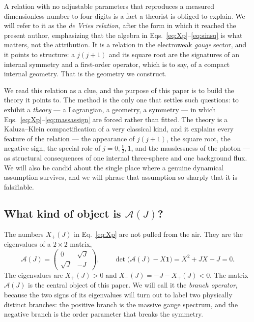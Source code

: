 \documentclass[11pt]{article}
\theoremstyle{plain}
\theoremstyle{definition}
\newcommand{\cA}{\mathcal{A}}
\newcommand{\Xp}{X_{+}}
\newcommand{\Xm}{X_{-}}
\newcommand{\half}{\tfrac12}
\begin{document}
A relation with no adjustable parameters that reproduces a measured
dimensionless number to four digits is a fact a theorist is obliged to
explain. We will refer to it as the \emph{de Vries relation}, after the form
in which it reached the present author, emphasizing that the algebra in
Eqs.~\eqref{eq:Xp}--\eqref{eq:sinsq} is what matters, not the attribution.
It is a relation in the electroweak \emph{gauge} sector, and it points to
structure: a $j(j+1)$ and its square root are the signatures of an internal
symmetry and a first-order operator, which is to say, of a compact internal
geometry. That is the geometry we construct.

We read this relation as a clue, and the purpose of this paper is to build
the theory it points to. The method is the only one that settles such
questions: to exhibit a \emph{theory} --- a Lagrangian, a geometry, a
symmetry --- in which Eqs.~\eqref{eq:Xp}--\eqref{eq:massassign} are forced
rather than fitted. The theory is a Kaluza--Klein compactification of a very
classical kind, and it explains every feature of the relation --- the
appearance of $j(j+1)$, the square root, the negative sign, the special role
of $j=0,\half,1$, and the masslessness of the photon --- as structural
consequences of one internal three-sphere
and one background flux. We will also be candid about the single place
where a genuine dynamical assumption survives, and we will phrase that
assumption so sharply that it is falsifiable.

\subsection{What kind of object is \texorpdfstring{$\cA(J)$}{A(J)}?}

The numbers $\Xp(J)$ in Eq.~\eqref{eq:Xp} are not pulled from the air. They
are the eigenvalues of a $2\times2$ matrix,
\begin{equation}
\cA(J)=
\begin{pmatrix}
0&\sqrt J\\[1mm]
\sqrt J&-J
\end{pmatrix},
\qquad
\det\bigl(\cA(J)-X\bm1\bigr)=X^2+JX-J=0 .
\label{eq:block}
\end{equation}
The eigenvalues are $\Xp(J)>0$ and $\Xm(J)=-J-\Xp(J)<0$. The matrix
$\cA(J)$ is the central object of this paper. We will call it the
\emph{branch operator}, because the two signs of its eigenvalues will turn
out to label two physically distinct branches: the positive branch is the
massive gauge spectrum, and the negative branch is the order parameter that
breaks the symmetry.
\end{document}
